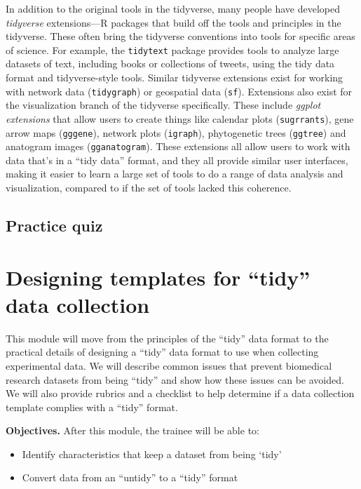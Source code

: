 \documentclass[]{tufte-book}
\providecommand{\tightlist}{%
  \setlength{\itemsep}{0pt}\setlength{\parskip}{0pt}}
\begin{document}
In addition to the original tools in the tidyverse, many people have developed
\emph{tidyverse} extensions---R packages that build off the tools and principles in
the tidyverse. These often bring the tidyverse conventions into tools for
specific areas of science. For example, the \texttt{tidytext} package provides tools to
analyze large datasets of text, including books or collections of tweets, using
the tidy data format and tidyverse-style tools. Similar tidyverse extensions
exist for working with network data (\texttt{tidygraph}) or geospatial data (\texttt{sf}).
Extensions also exist for the visualization branch of the tidyverse
specifically. These include \emph{ggplot extensions} that allow users to create
things like calendar plots (\texttt{sugrrants}), gene arrow maps (\texttt{gggene}), network
plots (\texttt{igraph}), phytogenetic trees (\texttt{ggtree}) and anatogram images
(\texttt{gganatogram}). These extensions all allow users to work with data that's in a
``tidy data'' format, and they all provide similar user interfaces, making it
easier to learn a large set of tools to do a range of data analysis and
visualization, compared to if the set of tools lacked this coherence.

\hypertarget{practice-quiz}{%
\subsection{Practice quiz}\label{practice-quiz}}

\hypertarget{designing-templates-for-tidy-data-collection}{%
\section{Designing templates for ``tidy'' data collection}\label{designing-templates-for-tidy-data-collection}}

This module will move from the principles of the ``tidy'' data format to the
practical details of designing a ``tidy'' data format to use when collecting
experimental data. We will describe common issues that prevent biomedical
research datasets from being ``tidy'' and show how these issues can be avoided. We
will also provide rubrics and a checklist to help determine if a data collection
template complies with a ``tidy'' format.

\textbf{Objectives.} After this module, the trainee will be able to:

\begin{itemize}
\tightlist
\item
  Identify characteristics that keep a dataset from being `tidy'
\item
  Convert data from an ``untidy'' to a ``tidy'' format
\end{itemize}
\end{document}
